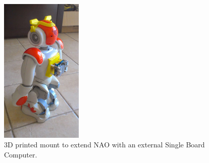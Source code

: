 \begin{figure}
	[h] \centering 
	\includegraphics[height=7cm]{figures/content/nao-bag.jpg} \caption{3D printed mount to extend NAO with an external Single Board Computer. \cite{nao-helmet} } \label{fg:nao:bag} 
\end{figure}
